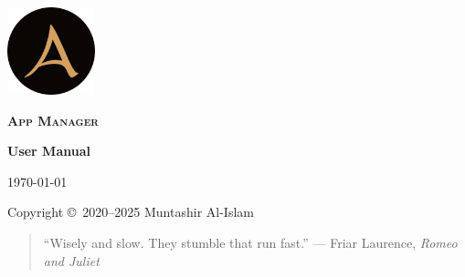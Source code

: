 \begin{titlingpage}
    \pagecolor{SunTan}
    \begin{center}
        \includegraphics[width=1in]{../images/icon}\par\vspace{1cm}
        {\Huge\textbf{\textsc{App Manager}}\par}
        \vspace{2.5cm}
        {\huge\bfseries User Manual\par}
        \vspace{.5cm}
        {\Large\itshape\version\par}
        \vfill
        {\large\today\par}
        \vfill
        {Copyright \copyright\ 2020--2025 Muntashir Al-Islam\par}
        \pagebreak
        \pagecolor{white}
        \begin{quotation}
            ``Wisely and slow. They stumble that run fast.''
                {--- Friar Laurence, \textit{Romeo and Juliet}}
        \end{quotation}
    \end{center}
\end{titlingpage}
